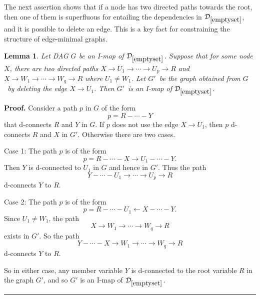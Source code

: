 \documentclass{elsarticle}%
\newtheorem{lemma}[theorem]{Lemma}
\renewenvironment{proof}[1][Proof]{\noindent\textbf{#1.} }{\ \rule{0.5em}{0.5em}}
\newcommand{\R}{R}
\newcommand{\X}{X}
\newcommand{\Y}{Y}
\newcommand{\U}{U}
\newcommand{\W}{W}
\newcommand{\G}{G}
\newcommand{\D}{\mathcal{D}}
\newcommand{\p}{p} %
\begin{document}
The next assertion shows that if a node has two directed paths towards the root, then one of them is superfluous for entailing the dependencies in $\D_{\ref{emptyset}}$, and it is possible to delete an edge. This is a key fact for constraining the structure of edge-minimal graphs.

\begin{lemma} \label{ass:delete}
Let DAG $G$ be an I-map of $\D_{\ref{emptyset}}$. Suppose
that for some node $\X$, there are two directed paths $\X \rightarrow
U_{1}\rightarrow\cdots\rightarrow U_{p}\rightarrow R$ and
$\X \rightarrow W_{1}\rightarrow\cdots\rightarrow W_{q}\rightarrow R$ where $\U_{1} \neq \W_{1}$.
Let $G'$\ be the graph obtained from $G$\ by deleting
the edge $\X \rightarrow U_{1}$. Then $G'$\ is an I-map of
$\D_{\ref{emptyset}}$.
\end{lemma}


\begin{proof}
Consider a path $p$ in $G$ of the form $$p=\R-\cdots-\Y$$ that d-connects $R$ and
$\Y$ in $G$. If $p$ does not use the edge $\X \rightarrow U_{1}$, then $\p$
d-connects $\R$ and $\X$ in $G'$. Otherwise there are two cases.

Case 1: The path $\p$ is of the form $$p=R-\cdots-\X \rightarrow \U_{1}-\cdots-\Y.$$ Then $\Y$ is d-connected to $\U_{1}$ in $\G$ and hence in $\G'$. Thus the path $$\Y-\cdots-\U_{1} \rightarrow\cdots\rightarrow U_{p}\rightarrow \R$$ d-connects $\Y$ to $\R$.

Case 2: The path $\p$ is of the form $$p=R-\cdots-\U_{1} \leftarrow \X-\cdots-\Y.$$ Since $\U_{1} \neq \W_{1}$, the path $$\X \rightarrow W_{1}\rightarrow\cdots\rightarrow W_{q}\rightarrow R$$ exists in $\G'$. So the path $$\Y-\cdots-\X  \rightarrow W_{1}\rightarrow\cdots\rightarrow W_{q}\rightarrow \R$$ d-connects $\Y$ to $\R$.

So in either case, any member variable $\Y$ is d-connected to the root variable $\R$ in the graph $\G'$, and so $\G'$ is an I-map of $\D_{\ref{emptyset}}$.
\end{proof}
\end{document}
